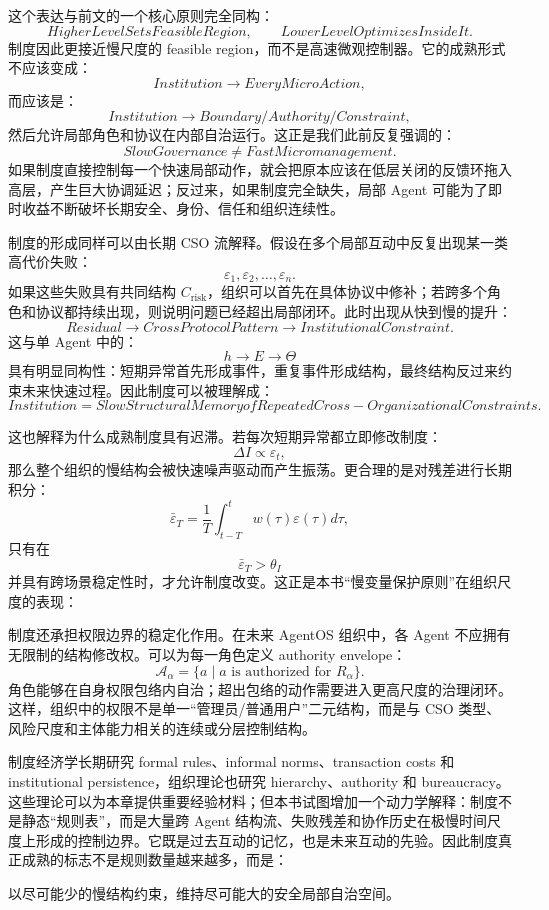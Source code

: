 这个表达与前文的一个核心原则完全同构：
\[
\boxed{
HigherLevelSetsFeasibleRegion,\qquad
LowerLevelOptimizesInsideIt.
}
\]
制度因此更接近慢尺度的 feasible region，而不是高速微观控制器。它的成熟形式不应该变成：
\[
Institution
\rightarrow
EveryMicroAction,
\]
而应该是：
\[
Institution
\rightarrow
Boundary/Authority/Constraint,
\]
然后允许局部角色和协议在内部自治运行。这正是我们此前反复强调的：
\[
\boxed{
SlowGovernance\neq FastMicromanagement.
}
\]
如果制度直接控制每一个快速局部动作，就会把原本应该在低层关闭的反馈环拖入高层，产生巨大协调延迟；反过来，如果制度完全缺失，局部 Agent 可能为了即时收益不断破坏长期安全、身份、信任和组织连续性。

制度的形成同样可以由长期 CSO 流解释。假设在多个局部互动中反复出现某一类高代价失败：
\[
\varepsilon_1,\varepsilon_2,\ldots,\varepsilon_n.
\]
如果这些失败具有共同结构 $C_{\mathrm{risk}}$，组织可以首先在具体协议中修补；若跨多个角色和协议都持续出现，则说明问题已经超出局部闭环。此时出现从快到慢的提升：
\[
Residual
\rightarrow
CrossProtocolPattern
\rightarrow
InstitutionalConstraint.
\]
这与单 Agent 中的：
\[
h\rightarrow E\rightarrow\Theta
\]
具有明显同构性：短期异常首先形成事件，重复事件形成结构，最终结构反过来约束未来快速过程。因此制度可以被理解成：
\[
\boxed{
Institution
=
Slow Structural Memory of Repeated Cross-Organizational Constraints.
}
\]

这也解释为什么成熟制度具有迟滞。若每次短期异常都立即修改制度：
\[
\Delta I\propto\varepsilon_t,
\]
那么整个组织的慢结构会被快速噪声驱动而产生振荡。更合理的是对残差进行长期积分：
\[
\bar{\varepsilon}_T
=
\frac{1}{T}
\int_{t-T}^{t}
w(\tau)\varepsilon(\tau)d\tau,
\]
只有在
\[
\bar{\varepsilon}_T>\theta_I
\]
并具有跨场景稳定性时，才允许制度改变。这正是本书“慢变量保护原则”在组织尺度的表现：
\begin{statementbox}
\centering
{}
\end{statementbox}

制度还承担权限边界的稳定化作用。在未来 AgentOS 组织中，各 Agent 不应拥有无限制的结构修改权。可以为每一角色定义 authority envelope：
\[
\mathcal A_\alpha
=
\{
a\mid
a\text{ is authorized for }R_\alpha
\}.
\]
角色能够在自身权限包络内自治；超出包络的动作需要进入更高尺度的治理闭环。这样，组织中的权限不是单一“管理员/普通用户”二元结构，而是与 CSO 类型、风险尺度和主体能力相关的连续或分层控制结构。

制度经济学长期研究 formal rules、informal norms、transaction costs 和 institutional persistence，组织理论也研究 hierarchy、authority 和 bureaucracy。这些理论可以为本章提供重要经验材料；但本书试图增加一个动力学解释：制度不是静态“规则表”，而是大量跨 Agent 结构流、失败残差和协作历史在极慢时间尺度上形成的控制边界。它既是过去互动的记忆，也是未来互动的先验。因此制度真正成熟的标志不是规则数量越来越多，而是：
\begin{remark}
以尽可能少的慢结构约束，维持尽可能大的安全局部自治空间。
\end{remark}



